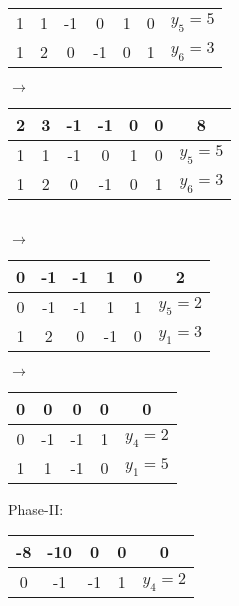 \documentclass[12pt]{article}
\begin{document}
\begin{enumerate}
\begin{enumerate}
\begin{table}[H]
\begin{tabular}{cccccc|c}
                                    1 & 1 & -1 & 0  & 1  & 0  & $y_5=5$ \\
                                    1 & 2 & 0  & -1 & 0  & 1  & $y_6=3$ \\
                              \end{tabular}$\rightarrow$
                              \begin{tabular}{cccccc|c}
                                    2 & 3 & -1 & -1 & 0 & 0 & 8       \\
                                    \hline
                                    1 & 1 & -1 & 0  & 1 & 0 & $y_5=5$ \\
                                    1 & 2 & 0  & -1 & 0 & 1 & $y_6=3$ \\
                              \end{tabular}\\
                              $\rightarrow$
                              \begin{tabular}{ccccc|c}
                                    0 & -1 & -1 & 1  & 0 & 2       \\
                                    \hline
                                    0 & -1 & -1 & 1  & 1 & $y_5=2$ \\
                                    1 & 2  & 0  & -1 & 0 & $y_1=3$ \\
                              \end{tabular}
                              $\rightarrow$
                              \begin{tabular}{cccc|c}
                                    0 & 0  & 0  & 0 & 0       \\
                                    \hline
                                    0 & -1 & -1 & 1 & $y_4=2$ \\
                                    1 & 1  & -1 & 0 & $y_1=5$
                              \end{tabular}
                        \end{table}
                        Phase-II:
                        \begin{table}[H]
                              \centering
                              \begin{tabular}{cccc|c}
                                    -8 & -10 & 0  & 0 & 0       \\
                                    \hline
                                    0  & -1  & -1 & 1 & $y_4=2$ \\

\end{tabular}
\end{table}
\end{enumerate}
\end{enumerate}
\end{document}
